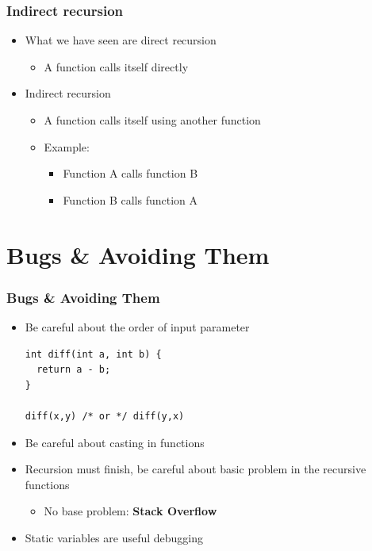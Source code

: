 \documentclass{../c-lecture}
\begin{document}
\begin{frame}
  \frametitle{Indirect recursion}
  \begin{itemize}
    \item What we have seen are direct recursion
    \begin{itemize}
      \item A function calls itself directly
    \end{itemize}
    \item Indirect recursion
    \begin{itemize}
      \item A function calls itself using another function
      \item Example:
      \begin{itemize}
        \item Function A calls function B
        \item Function B calls function A
      \end{itemize}
    \end{itemize}
  \end{itemize}
\end{frame}

\section{Bugs \& Avoiding Them}

\begin{frame}[fragile]
  \frametitle{Bugs \& Avoiding Them}
  \begin{itemize}
    \item Be careful about the order of input parameter
    \begin{verbatim}
int diff(int a, int b) {
  return a - b;
}

diff(x,y) /* or */ diff(y,x)
    \end{verbatim}
    \item Be careful about casting in functions
    \item
      Recursion must finish, be careful about basic problem in the recursive
      functions
    \begin{itemize}
      \item
        No base problem: \textbf{\color{YellowOrange} Stack Overflow}
    \end{itemize}
    \item Static variables are useful debugging
  \end{itemize}
\end{frame}
\end{document}
